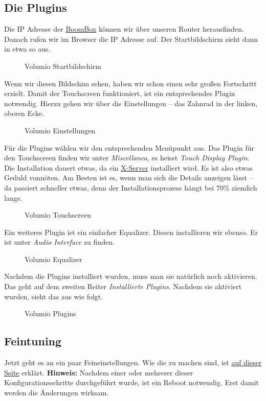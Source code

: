 \documentclass[12pt,a4paper]{article}
\newcommand{\bb}{\href{https://github.com/ThirtySomething/BoomBox}{BoomBox}}
\newcommand{\capla}[1]{\caption{#1}\label{fig:#1}}
\newcommand{\jpaimg}[2]{\begin{figure}[H]\centering\fbox{\texttt{[image: \#1]}}\capla{#2}\end{figure}}
\begin{document}
\subsection{Die Plugins}
Die IP Adresse der \bb{} können wir über unseren Router herausfinden. Danach
rufen wir im Browser die IP Adresse auf. Der Startbildschirm sieht dann in etwa
so aus.

\jpaimg{./../images/vol-main.png}{Volumio Startbildschirm}

Wenn wir diesen Bildschim sehen, haben wir schon einen sehr großen Fortschritt
erzielt. Damit der Touchscreen funktioniert, ist ein entsprechendes Plugin
notwendig. Hierzu gehen wir über die Einstellungen -- das Zahnrad in der linken,
oberen Ecke.

\jpaimg{./../images/vol-setup.png}{Volumio Einstellungen}

Für die Plugins wählen wir den entsprechenden Menüpunkt aus. Das Plugin für den
Touchscreen finden wir unter \textit{Miscellanea}, es heisst \textit{Touch
Display Plugin}. Die Installation dauert etwas, da ein
\href{https://de.wikipedia.org/wiki/X_Window_System}{X-Server} installiert
wird. Es ist also etwas Geduld vonnöten. Am Besten ist es, wenn man sich die
Details anzeigen lässt -- da passiert schneller etwas, denn der
Installationsprozess hängt bei 70\% ziemlich lange.

\jpaimg{./../images/vol-touch.png}{Volumio Touchscreen}

Ein weiteres Plugin ist ein einfacher Equalizer. Diesen installieren wir
ebenso. Er ist unter \textit{Audio Interface} zu finden.

\jpaimg{./../images/vol-equal.png}{Volumio Equalizer}

Nachdem die Plugins installiert wurden, muss man sie natürlich noch aktivieren.
Das geht auf dem zweiten Reiter \textit{Installierte Plugins}. Nachdem sie
aktiviert wurden, sieht das aus wie folgt.

\jpaimg{./../images/vol-plug-active.png}{Volumio Plugins}

\subsection{Feintuning}\label{subsec:Feintuning}

Jetzt geht es an ein paar Feineinstellungen. Wie die zu machen sind, ist
\href{https://volumio.org/forum/guide-for-setting-touchscreen-backlight-control-t11425.html}{auf dieser Seite}
erklärt. \textbf{Hinweis:} Nachdem einer oder mehrerer dieser
Konfigurationsschritte durchgeführt wurde, ist ein Reboot notwendig. Erst damit
werden die Änderungen wirksam.
\end{document}
